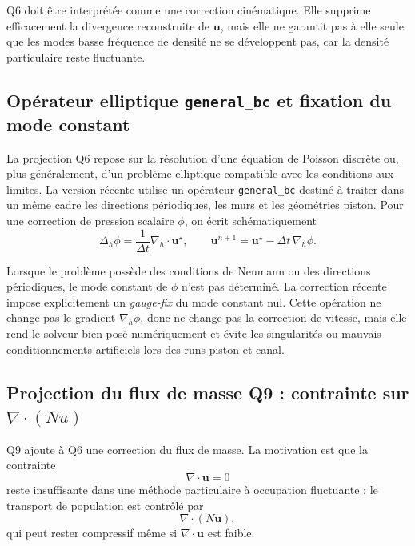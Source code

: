 \documentclass[11pt,a4paper]{article}
\begin{document}
Q6 doit être interprétée comme une correction cinématique. Elle supprime efficacement la divergence reconstruite de $\bm{u}$, mais elle ne garantit pas à elle seule que les modes basse fréquence de densité ne se développent pas, car la densité particulaire reste fluctuante.


\subsection{Opérateur elliptique \texttt{general\_bc} et fixation du mode constant}

La projection Q6 repose sur la résolution d'une équation de Poisson discrète ou, plus généralement, d'un problème elliptique compatible avec les conditions aux limites. La version récente utilise un opérateur \texttt{general\_bc} destiné à traiter dans un même cadre les directions périodiques, les murs et les géométries piston. Pour une correction de pression scalaire \(\phi\), on écrit schématiquement
\begin{equation}
  \Delta_h \phi = \frac{1}{\Delta t}\nabla_h\cdot\bm u^\star,
  \qquad
  \bm u^{n+1}=\bm u^\star-\Delta t\,\nabla_h\phi.
\end{equation}

Lorsque le problème possède des conditions de Neumann ou des directions périodiques, le mode constant de \(\phi\) n'est pas déterminé. La correction récente impose explicitement un \emph{gauge-fix} du mode constant nul. Cette opération ne change pas le gradient \(\nabla_h\phi\), donc ne change pas la correction de vitesse, mais elle rend le solveur bien posé numériquement et évite les singularités ou mauvais conditionnements artificiels lors des runs piston et canal.

\subsection{Projection du flux de masse Q9 : contrainte sur $\nabla\cdot(Nu)$}

Q9 ajoute à Q6 une correction du flux de masse. La motivation est que la contrainte
\begin{equation}
  \nabla\cdot \bm{u}=0
\end{equation}
reste insuffisante dans une méthode particulaire à occupation fluctuante : le transport de population est contrôlé par
\begin{equation}
  \nabla\cdot (N\bm{u}),
\end{equation}
qui peut rester compressif même si $\nabla\cdot\bm{u}$ est faible.
\end{document}
